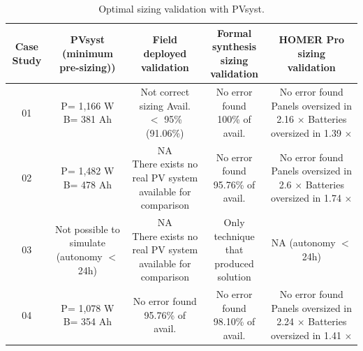 \documentclass[review]{elsarticle}
\begin{document}
\begin{landscape}
\begin{table}
\centering
\caption{Optimal sizing validation with PVsyst.}
\label{tab2}
\begin{scriptsize}
\begin{tabular}{c|c|c|c|c}
\hline
\hline
Case Study & \makecell{PVsyst\\(minimum pre-sizing))}& \makecell{Field\\deployed\\validation}& \makecell{Formal synthesis\\sizing\\validation}& \makecell{HOMER Pro\\sizing\\validation}\\
\hline
\hline
01 & \makecell{P= 1,166 W\\B= 381 Ah} & \makecell{Not correct sizing \\Avail. $<$ 95\%\\(91.06\%)} & \makecell{No error found \\100\% of avail.} & \makecell{No error found\\Panels oversized in 2.16 $\times$\\Batteries oversized in 1.39 $\times$}\\
\hline
02 & \makecell{P= 1,482 W\\B= 478 Ah} & \makecell{NA\\There exists no real PV system\\available for comparison} & \makecell{No error found \\95.76\% of avail.} & \makecell{No error found\\Panels oversized in 2.6 $\times$\\Batteries oversized in 1.74 $\times$}\\
\hline
03 & \makecell{Not possible to \\simulate\\(autonomy $<$ 24h)} & \makecell{NA\\There exists no real PV system\\available for comparison} & \makecell{Only technique that\\produced solution} & \makecell{NA\\(autonomy $<$ 24h)}\\
\hline
04 & \makecell{P= 1,078 W\\B= 354 Ah} & \makecell{No error found \\95.76\% of avail.} & \makecell{No error found \\98.10\% of avail.} & \makecell{No error found\\Panels oversized in 2.24 $\times$\\Batteries oversized in 1.41 $\times$}\\

\end{tabular}
\end{scriptsize}
\end{table}
\end{landscape}
\end{document}
